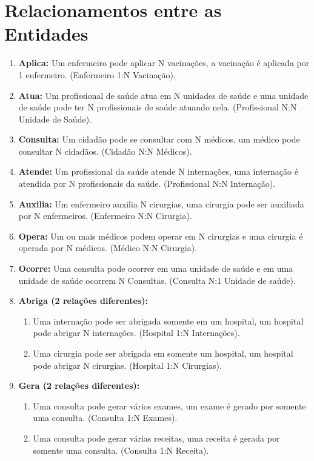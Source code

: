 \documentclass[12pt, a4paper]{article}
\begin{document}
\section{Relacionamentos entre as Entidades}
\begin{enumerate}
    \item \textbf{Aplica:} Um enfermeiro pode aplicar N vacinações, a vacinação é aplicada por 1 enfermeiro. (Enfermeiro 1:N Vacinação).
    
    \item \textbf{Atua:} Um profissional de saúde atua em N unidades de saúde e uma unidade de saúde pode ter N profissionais de saúde atuando nela. (Profissional N:N Unidade de Saúde).
    
    \item \textbf{Consulta:} Um cidadão pode se consultar com N médicos, um médico pode consultar N cidadãos. (Cidadão N:N Médicos).
    
    \item \textbf{Atende:} Um profissional da saúde atende N internações, uma internação é atendida por N profissionais da saúde. (Profissional N:N Internação).
    
    \item \textbf{Auxilia:} Um enfermeiro auxilia N cirurgias, uma cirurgia pode ser auxiliada por N enfermeiros. (Enfermeiro N:N Cirurgia).
    
    \item \textbf{Opera:} Um ou mais médicos podem operar em N cirurgias e uma cirurgia é operada por N médicos. (Médico N:N Cirurgia).
    
    \item \textbf{Ocorre:} Uma consulta pode ocorrer em uma unidade de saúde e em uma unidade de saúde ocorrem N Consultas. (Consulta N:1 Unidade de saúde).
    
    \item \textbf{Abriga (2 relações diferentes):}
    \begin{enumerate}
        \item Uma internação pode ser abrigada somente em um hospital, um hospital pode abrigar N internações. (Hospital 1:N Internações).
        \item Uma cirurgia pode ser abrigada em somente um hospital, um hospital pode abrigar N cirurgias. (Hospital 1:N Cirurgias).
    \end{enumerate}
    
    \item \textbf{Gera (2 relações diferentes):}
    \begin{enumerate}
        \item Uma consulta pode gerar vários exames, um exame é gerado por somente uma consulta. (Consulta 1:N Exames).
        \item Uma consulta pode gerar várias receitas, uma receita é gerada por somente uma consulta. (Consulta 1:N Receita).
    \end{enumerate}
\end{enumerate}
\end{document}
